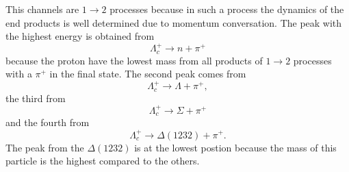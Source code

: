 This channels are \( 1 \rightarrow 2 \) processes because in such a process the 
dynamics of the end products is well determined due to momentum conversation.
The peak with the highest energy is obtained from 
\begin{equation}
  \Lambda_c^+ \rightarrow n + \pi^+ \nonumber
\end{equation}
because the proton have the lowest mass from all products of \( 1 \rightarrow 2 \) 
processes with a \(\pi^+\) in the final state. The second peak comes from 
\begin{equation}
  \Lambda_c^+ \rightarrow \Lambda + \pi^+, \nonumber
\end{equation}
the third from 
\begin{equation}
  \Lambda_c^+ \rightarrow \Sigma + \pi^+ \nonumber
\end{equation}
and the fourth from 
\begin{equation}
  \Lambda_c^+ \rightarrow \Delta(1232) + \pi^+. \nonumber
\end{equation}
The peak from the \(\Delta(1232)\) is at the lowest postion because the mass of 
this particle is the highest compared to the others.

